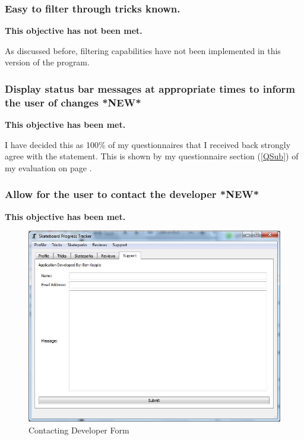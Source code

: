 \subsubsection{ Easy to filter through tricks known.}

\textbf{This objective has not been met.}

As discussed before, filtering capabilities have not been implemented in this version of the program.



\subsubsection {Display status bar messages at appropriate times to inform the user of changes *NEW*} %

\textbf{This objective has been met.}

I have decided this as 100\% of my questionnaires that I received back strongly agree with the statement. This is shown by my questionnaire section (\ref{QSub}) of my evaluation on page \pageref{QSub}.



\subsubsection {Allow for the user to contact the developer *NEW*}

\textbf{This objective has been met.}


\begin{figure}[H]
    \includegraphics[width=\textwidth]{./Evaluation/images/Contactsupport.jpg}
    \caption{Contacting Developer Form} \label{fig:ContactSupportEVD}
\end{figure}

